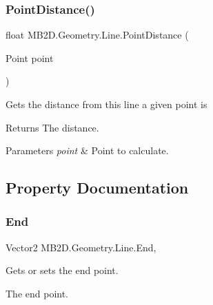 \subsubsection{\texorpdfstring{Point\+Distance()}{PointDistance()}\hspace{0.1cm}{\footnotesize\ttfamily [2/2]}}
{\footnotesize\ttfamily float M\+B2\+D.\+Geometry.\+Line.\+Point\+Distance (\begin{DoxyParamCaption}\item[{Point}]{point }\end{DoxyParamCaption})\hspace{0.3cm}{\ttfamily [inline]}}



Gets the distance from this line a given point is 

\begin{DoxyReturn}{Returns}
The distance.
\end{DoxyReturn}

\begin{DoxyParams}{Parameters}
{\em point} & Point to calculate.\\
\hline
\end{DoxyParams}


\subsection{Property Documentation}
\hypertarget{class_m_b2_d_1_1_geometry_1_1_line_a17eb89f60f0bb666884655d4efd18be5}{}\label{class_m_b2_d_1_1_geometry_1_1_line_a17eb89f60f0bb666884655d4efd18be5} 
\subsubsection{\texorpdfstring{End}{End}}
{\footnotesize\ttfamily Vector2 M\+B2\+D.\+Geometry.\+Line.\+End\hspace{0.3cm}{\ttfamily [get]}, {\ttfamily [set]}}



Gets or sets the end point. 

The end point.\hypertarget{class_m_b2_d_1_1_geometry_1_1_line_aa02111d13427d3b169c73bb354f7bb53}{}\label{class_m_b2_d_1_1_geometry_1_1_line_aa02111d13427d3b169c73bb354f7bb53} 
